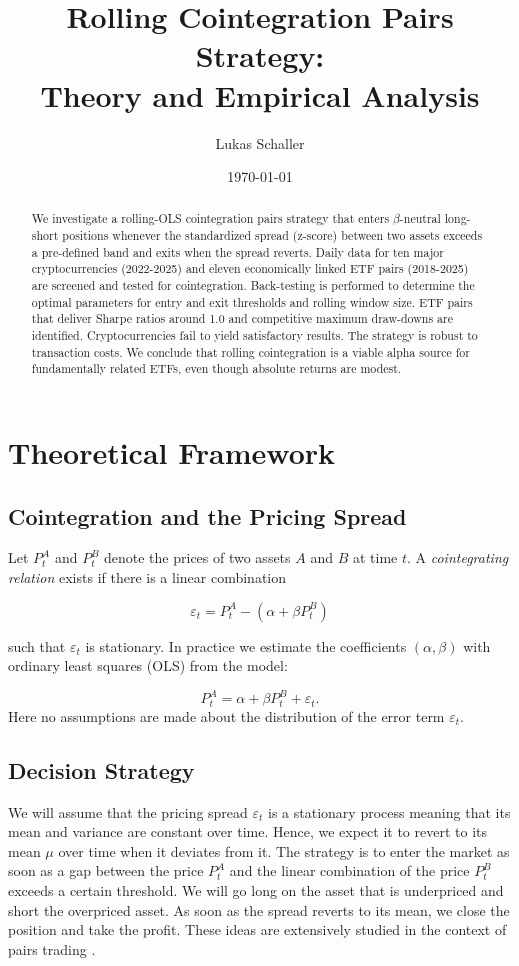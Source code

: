 \documentclass{article}
\title{Rolling Cointegration Pairs Strategy: \\Theory and Empirical Analysis}
\author{Lukas Schaller}
\date{\today}
\begin{document}
\maketitle

\begin{abstract}
We investigate a rolling-OLS cointegration pairs strategy that enters $\beta$-neutral long-short positions whenever the standardized spread (z-score) between two assets exceeds a pre-defined band and exits when the spread reverts.
Daily data for ten major cryptocurrencies (2022-2025) and eleven economically linked ETF pairs (2018-2025) are screened and tested for cointegration. Back-testing is performed to determine the optimal parameters for entry and exit thresholds and rolling window size.
ETF pairs that deliver Sharpe ratios around 1.0 and competitive maximum draw-downs are identified. Cryptocurrencies fail to yield satisfactory results.
The strategy is robust to transaction costs. We conclude that rolling cointegration is a viable alpha source for fundamentally related ETFs, even though absolute returns are modest.
\end{abstract}
\newpage
\tableofcontents
\setlength{\parskip}{0pt}
\clearpage  

\section{Theoretical Framework}
\label{sec:theory}

\subsection{Cointegration and the Pricing Spread}

Let \(P_t^{A}\) and \(P_t^{B}\) denote the prices of two assets $A$ and $B$ at time
\(t\).
A \emph{cointegrating relation} exists if there is a linear combination

\[
\varepsilon_t = P_t^{A} - (\alpha + \beta P_t^{B})
\]

such that \(\varepsilon_t\) is stationary.
In practice we estimate the coefficients \((\alpha,\beta)\) with ordinary least squares (OLS) from the model:

\[
P_t^{A} = \alpha + \beta P_t^{B} + \varepsilon_t.
\]
Here no assumptions are made about the distribution of the error term \(\varepsilon_t\).

\subsection{Decision Strategy}
We will assume that the pricing spread \(\varepsilon_t\) is a stationary process meaning that its mean and variance are constant over time.
Hence, we expect it to revert to its mean \(\mu\) over time when it deviates from it.
The strategy is to enter the market as soon as a gap between the price $P_t^{A}$ and the linear combination of the price $P_t^{B}$ exceeds a certain threshold.
We will go long on the asset that is underpriced and short the overpriced asset. As soon as the spread reverts to its mean, we close the position and take the profit. These ideas are extensively studied in the context of pairs trading \parencite{Vidyamurthy2004PairsTrading, Gatev2006PairsTrading}.
\end{document}
